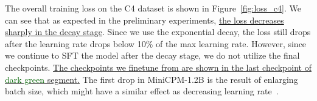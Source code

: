 
The overall training loss on the C4 dataset is shown in Figure~\ref{fig:loss_c4}. We can see that as expected in the preliminary experiments, \uline{the loss decreases sharply in the decay stage}. Since we use the exponential decay, the loss still drops after the learning rate drops below 10\% of the max learning rate. However, since we continue to SFT the model after the decay stage, we do not utilize the final checkpoints. \uline{The checkpoints we finetune from are shown in the last checkpoint of \textcolor{darkgreen}{dark green} segment.} The first drop in MiniCPM-1.2B is the result of enlarging batch size, which might have a similar effect as decreasing learning rate~\citep{smith2017don}.


